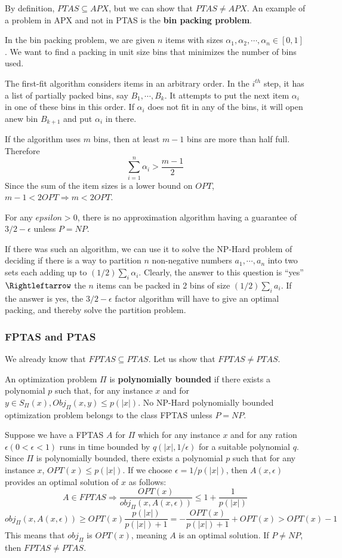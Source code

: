 \documentclass[12pt,letterpaper]{article}
\theoremstyle{definition}
\begin{document}
By definition, $PTAS \subseteq APX$, but we can show that $PTAS \neq APX$. An example of a problem in APX and not in PTAS is the \textbf{bin packing problem}.

In the bin packing problem, we are given $n$ items with sizes $\alpha_1, \alpha_2, \cdots, \alpha_n \in [0,1]$. We want to find a packing in unit size bins that minimizes the number of bins used.

The first-fit algorithm considers items in an arbitrary order. In the $i^{th}$ step, it has a list of partially packed bins, say $B_1, \cdots, B_k$. It attempts to put the next item $\alpha_i$ in one of these bins in this order. If $\alpha_i$ does not fit in any of the bins, it will open anew bin $B_{k+1}$ and put $\alpha_i$ in there.

If the algorithm uses $m$ bins, then at least $m-1$ bins are more than half full. Therefore
\[\sum_{i=1}^n \alpha_i > \frac{m-1}{2}\]
Since the sum of the item sizes is a lower bound on $OPT$, $m-1 < 2 OPT \Rightarrow m < 2 OPT$.

For any $epsilon > 0$, there is no approximation algorithm having a guarantee of $3/2 - \epsilon$ unless $P = NP$.

If there was such an algorithm, we can use it to solve the NP-Hard problem of deciding if there is a way to partition $n$ non-negative numbers $a_1, \cdots, a_n$ into two sets each adding up to $(1/2) \sum_i \alpha_i$. Clearly, the answer to this question is ``yes'' $\Rightleftarrow$ the $n$ items can be packed in 2 bins of size $(1/2) \sum_i a_i$. If the answer is yes, the $3/2 - \epsilon$ factor algorithm will have to give an optimal packing, and thereby solve the partition problem.

\subsubsection{FPTAS and PTAS}

We already know that $FPTAS \subseteq PTAS$. Let us show that $FPTAS \neq PTAS$.

An optimization problem $\Pi$ is \textbf{polynomially bounded} if there exists a polynomial $p$ such that, for any instance $x$ and for $y \in S_\Pi(x), Obj_\Pi(x,y) \leq p(|x|)$. No NP-Hard polynomially bounded optimization problem belongs to the class FPTAS unless $P=NP$.

Suppose we have a FPTAS $A$ for $\Pi$ which for any instance $x$ and for any ration $\epsilon (0 < \epsilon < 1)$  runs in time bounded by $q(|x|, 1/\epsilon)$ for a suitable polynomial $q$. Since $\Pi$ is polynomially bounded, there exists a polynomial $p$ such that for any instance $x$, $OPT(x) \leq p(|x|)$. If we choose $\epsilon = 1/p(|x|)$, then $A(x,\epsilon)$ provides an optimal solution of $x$ as follows:
\[A \in FPTAS \Rightarrow \frac{OPT(x)}{obj_\Pi(x,A(x,\epsilon))} \leq 1 + \frac{1}{p(|x|)}\]
\[obj_\Pi (x,A(x,\epsilon)) \geq OPT(x) \frac{p(|x|)}{p(|x|) + 1} = - \frac{OPT(x)}{p(|x|)+1} + OPT(x) > OPT(x) - 1\]
This means that $obj_\Pi$ is $OPT(x)$, meaning $A$ is an optimal solution. If $P \neq NP$, then $FPTAS \neq PTAS$.
\end{document}

